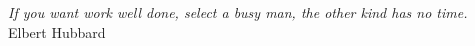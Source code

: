 
\chapter*{}

\vspace{4cm}


\vspace{11cm}
\begin{flushright}
	\textit
	{
		If you want work well done, select a busy man‚ the other kind has no time.
	}\medskip\\ 
	Elbert Hubbard
\end{flushright}